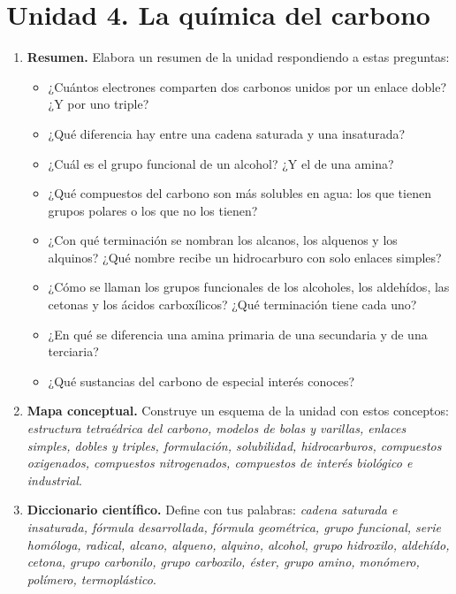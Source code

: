 \section{Unidad 4. La química del carbono}

\begin{enumerate}[label=\numberballred]
    \item \textbf{Resumen.} Elabora un resumen de la unidad respondiendo a estas preguntas:
    \begin{itemize}
        \item ¿Cuántos electrones comparten dos carbonos unidos por un enlace doble? ¿Y por uno triple?
        \item ¿Qué diferencia hay entre una cadena saturada y una insaturada?
        \item ¿Cuál es el grupo funcional de un alcohol? ¿Y el de una amina?
        \item ¿Qué compuestos del carbono son más solubles en agua: los que tienen grupos polares o los que no los tienen?
        \item ¿Con qué terminación se nombran los alcanos, los alquenos y los alquinos? ¿Qué nombre recibe un hidrocarburo con solo enlaces simples?
        \item ¿Cómo se llaman los grupos funcionales de los alcoholes, los aldehídos, las cetonas y los ácidos carboxílicos? ¿Qué terminación tiene cada uno?
        \item ¿En qué se diferencia una amina primaria de una secundaria y de una terciaria?
        \item ¿Qué sustancias del carbono de especial interés conoces?
    \end{itemize}
    \item \textbf{Mapa conceptual.} Construye un esquema de la unidad con estos conceptos: \emph{estructura tetraédrica del carbono, modelos de bolas y varillas, enlaces simples, dobles y triples, formulación, solubilidad, hidrocarburos, compuestos oxigenados, compuestos nitrogenados, compuestos de interés biológico e industrial}.
    \item \textbf{Diccionario científico.} Define con tus palabras: \emph{cadena saturada e insaturada, fórmula desarrollada, fórmula geométrica, grupo funcional, serie homóloga, radical, alcano, alqueno, alquino, alcohol, grupo hidroxilo, aldehído, cetona, grupo carbonilo, grupo carboxilo, éster, grupo amino, monómero, polímero, termoplástico}.
\end{enumerate}


